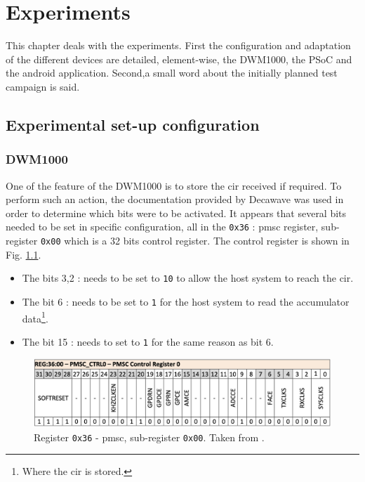 \chapter{Experiments}

This chapter deals with the experiments. First the configuration and adaptation of the different devices are detailed, element-wise, the DWM1000, the PSoC and the android application. Second,a small word about the initially planned test campaign is said.

\section{Experimental set-up configuration}

\subsection{DWM1000}

One of the feature of the DWM1000 is to store the \gls{cir} received if required. To perform such an action, the documentation provided by Decawave \cite{usermanual} was used in order to determine which bits were to be activated. It appears that several bits needed to be set in specific configuration, all in the \texttt{0x36} : \gls{pmsc} register, sub-register \texttt{0x00} which is a 32 bits control register. The control register is shown in Fig. \ref{fig:control_reg}.
\vspace{2mm}

\begin{itemize}
\item The bits 3,2 :    needs to be set to \texttt{10} to allow the host system to reach the \gls{cir}.
\item The bit 6 :  needs to be set to \texttt{1} for the host system to read the accumulator data\footnote{Where the \gls{cir} is stored.}.
\item The bit 15 :  needs to set to \texttt{1} for the same reason as bit 6.
\end{itemize}

\begin{figure}[H]
\centering
\includegraphics[width=.9\linewidth]{Images/control_ref.png}
\caption{Register \texttt{0x36} - \gls{pmsc}, sub-register \texttt{0x00}. Taken from \cite{usermanual}. \label{fig:control_reg}}
\end{figure}

